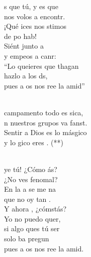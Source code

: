 \documentclass[12pt]{article}
\begin{document}
\begin{multicols*}{2}
\begin{cancion}%
	s que tú, y es que\\
	nos volos a encontr.\\
	¡Qué ices nos stimos\\
	de po hab!\\
	Siént junto a \\
	y empeos a canr:\\
	“Lo queieres que thagan\\
	hazlo  a los ds, \\
	pues a os nos ree la amid”\\\jump\\
	\begin{chorus}%
	campamento todo es sica,\\
	n nuestros grupos va fanst.\\
	Sentir a Dios es lo másgico \\
	y lo gico eres . (**)  \\
	\end{chorus}%
	\jump\\
	ye tú! ¿Cómo ás?\\
	¿No ves fenomal?\\
	En la a se me na\\
	que no oy tan .\\
	Y ahora , ¿cómstás?\\
	Yo no puedo quer,\\
	si algo ques tú ser\\
	solo ba pregun\\
	pues a os nos ree la amid.\\
\end{cancion}%


\end{multicols*}
\end{document}
